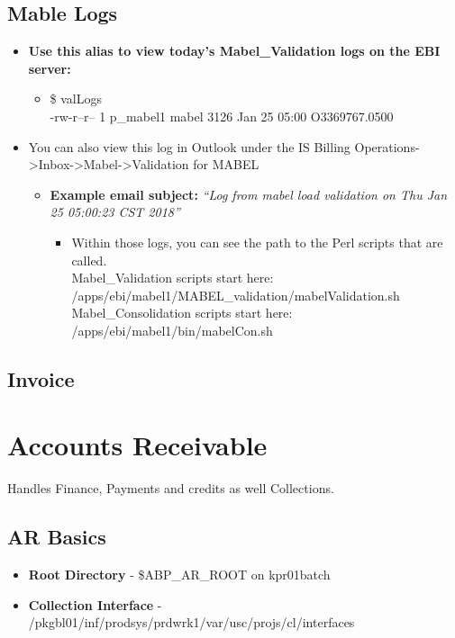 \documentclass[12pt,twoside]{article}
\begin{document}
\subsection{Mable Logs}
\label{sec:orgheadline57}
\begin{itemize}
\item \textbf{Use this alias to view today’s Mabel\_Validation logs on the EBI server:}
\begin{itemize}
\item{}\$ valLogs\\
-rw-r--r-- 1 p\_mabel1 mabel 3126 Jan 25 05:00 O3369767.0500
\end{itemize}
\item You can also view this log in Outlook under the IS Billing Operations->Inbox->Mabel->Validation for MABEL
\begin{itemize}
\item \textbf{Example email subject:} \emph{“Log from mabel load validation on Thu Jan 25 05:00:23 CST 2018”}
\begin{itemize}
\item Within those logs, you can see the path to the Perl scripts that are called. \\
Mabel\_Validation scripts start here:\\
 /apps/ebi/mabel1/MABEL\_validation/mabelValidation.sh\\
Mabel\_Consolidation scripts start here:\\
 /apps/ebi/mabel1/bin/mabelCon.sh
\end{itemize}
\end{itemize}
\end{itemize}
\subsection{Invoice}
\label{sec:orgheadline58}
\newpage
\section{Accounts Receivable}
\label{sec:orgheadline68}
Handles Finance, Payments and credits as well Collections.
\subsection{AR Basics}
\label{sec:orgheadline60}
\begin{itemize}
\item \textbf{Root Directory} - \$ABP\_AR\_ROOT on kpr01batch
\item \textbf{Collection Interface} -
/pkgbl01/inf/prodsys/prdwrk1/var/usc/projs/cl/interfaces
\end{itemize}
\end{document}
